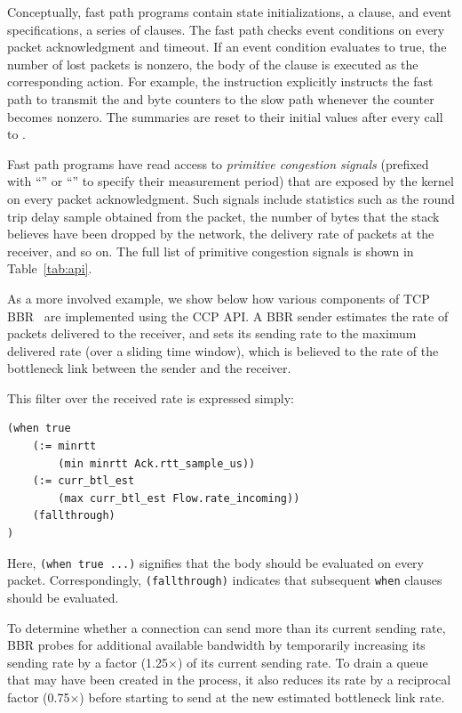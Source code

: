 Conceptually, fast path programs contain state initializations, \ie a 
clause, and event specifications, \ie a series of  clauses.
%
The fast path checks event conditions on every packet acknowledgment and timeout.
%
If an event condition evaluates to true, \eg the number of lost packets is
nonzero, the body of the  clause is executed as the corresponding
action.
%
For example, the  instruction explicitly instructs the fast path to
transmit the  and  byte counters to the slow path whenever
the  counter becomes nonzero.
%
The summaries are reset to their initial values after every call to
.

Fast path programs have read access to {\em primitive congestion
  signals} (prefixed with ``'' or ``'' to specify their measurement period) that are
exposed by the kernel on every packet acknowledgment.
%
Such signals include statistics such as the round trip delay sample obtained
from the packet, the number of bytes that the stack believes have been dropped
by the network, the delivery rate of packets at the receiver, and so on.
%
The full list of primitive congestion signals is shown in Table~\ref{tab:api}.

 As a more involved example, we show below
how various components of TCP BBR~\cite{bbr} are implemented using the CCP API.
%
A BBR sender estimates the rate of packets delivered to the receiver, and sets
its sending rate to the maximum delivered rate (over a sliding time
window), which is believed to the rate of the bottleneck link between the sender
and the receiver.

This filter over the received rate is expressed simply:
{\footnotesize
\begin{verbatim}
(when true
    (:= minrtt
        (min minrtt Ack.rtt_sample_us))
    (:= curr_btl_est
        (max curr_btl_est Flow.rate_incoming))
    (fallthrough)
)
\end{verbatim}
}

Here, \texttt{(when true ...)} signifies that the body should be evaluated on every packet.
Correspondingly, \texttt{(fallthrough)} indicates that subsequent \texttt{when} clauses should be evaluated.

To determine whether a connection can send more than its current sending rate,
BBR probes for additional available bandwidth by temporarily increasing its
sending rate by a factor (1.25$\times$) of its current sending rate.
%
To drain a queue that may have been created in the process, it also reduces its
rate by a reciprocal factor (0.75$\times$) before starting to send at the new estimated
bottleneck link rate.

